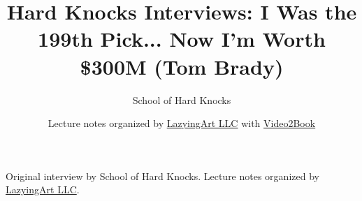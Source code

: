 \documentclass[11pt,oneside]{book}
\begin{document}
\frontmatter
\title{Hard Knocks Interviews: I Was the 199th Pick... Now I'm Worth \$300M (Tom Brady)}
\author{School of Hard Knocks}
\date{Lecture notes organized by \href{https://lazying.art}{LazyingArt LLC} with \href{https://github.com/lachlanchen/Video2Book}{Video2Book}}
\maketitle
\begin{center}
\small Original interview by School of Hard Knocks. Lecture notes organized by \href{https://lazying.art}{LazyingArt LLC}.
\end{center}
\clearpage
\mainmatter

\end{document}
